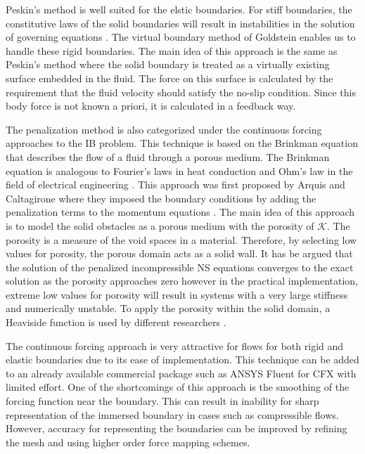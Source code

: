 Peskin's method is well suited for the elstic boundaries. For stiff boundaries, the constitutive laws of the solid boundaries will result in instabilities in the solution of governing equations \cite{mittal2005immersed}. The virtual boundary method of Goldstein \cite{goldstein1993modeling} enables us to handle these rigid boundaries. The main idea of this approach is the same as Peskin's method where the solid boundary is treated as a virtually existing surface embedded in the fluid. The force on this surface is calculated by the requirement that the fluid velocity should satisfy the no-slip condition. Since this body force is not known a priori, it is calculated in a feedback way.

The penalization method is also categorized under the continuous forcing approaches to the IB problem. This technique is based on the Brinkman equation that describes the flow of a fluid through a porous medium. The Brinkman equation is analogous to Fourier's laws in heat conduction and Ohm's law in the field of electrical engineering \cite{durlofsky1987analysis}. This approach was first proposed by Arquis and Caltagirone where they imposed the boundary conditions by adding the penalization terms to the momentum equations \cite{arquis1984conditions}. The main idea of this approach is to model the solid obstacles as a porous medium with the porosity of $\mathcal{K}$. The porosity is a measure of the void spaces in a material. Therefore, by selecting low values for porosity, the porous domain acts as a solid wall. It has be argued that the solution of the penalized incompressible NS equations converges to the exact solution as the porosity approaches zero \cite{angot1999analysis} however in the practical implementation, extreme low values for porosity will result in systems with a very large stiffness and numerically unstable. To apply the porosity within the solid domain, a Heaviside function is used by different researchers \cite{gazzola2011simulations, kevlahan2001computation}.

The continuous forcing approach is very attractive for flows for both rigid and elastic boundaries due to its ease of implementation. This technique can be added to an already available commercial package such as ANSYS Fluent for CFX with limited effort. One of the shortcomings of this approach is the smoothing of the forcing function near the boundary. This can result in inability for sharp representation of the immersed boundary in cases such as compressible flows. However, accuracy for representing the boundaries can be improved by refining the mesh and using higher order force mapping schemes.

